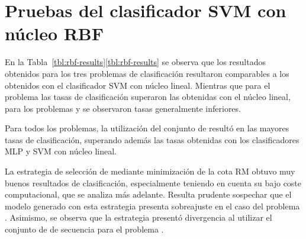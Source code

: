 %
%
%
\section{Pruebas del clasificador SVM con núcleo RBF}
%
En la
\iflatexml{}Tabla~\ref{tbl:rbf-results}\else\autoref{tbl:rbf-results}\fi
se observa que los resultados obtenidos para los tres problemas de
clasificación resultaron comparables a los obtenidos con el
clasificador SVM con núcleo lineal.
Mientras que para el problema \prob\tripletsvm{} las tasas de
clasificación superaron las obtenidas con el núcleo lineal, para los
problemas \prob\mipred{} y \prob\micropred{} se observaron tasas
generalmente inferiores.

Para todos los problemas, la utilización del conjunto de 
 resultó en las mayores tasas de clasificación, superando
además las tasas obtenidas con los clasificadores MLP y SVM con núcleo
lineal.

La estrategia de selección de  mediante minimización de la
cota RM obtuvo muy buenos resultados de clasificación, especialmente
teniendo en cuenta su bajo coste computacional, que se analiza más
adelante.
Resulta prudente sospechar que el modelo generado con esta estrategia
presenta sobreajuste en el caso del problema \prob\tripletsvm{}.
Asimismo, se observa que la estrategia presentó divergencia al
utilizar el conjunto de  de secuencia  para el
problema \prob\mipred{}.
